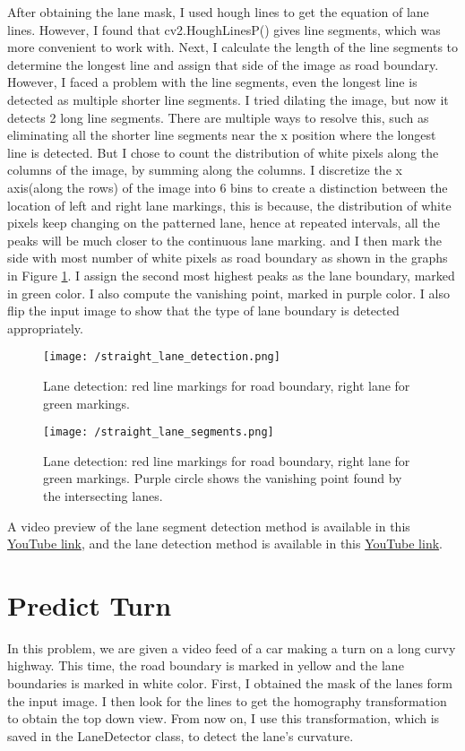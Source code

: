 \documentclass[a4paper, 10pt]{article}
\begin{document}
\begin{multicols}{2}
		After obtaining the lane mask, I used hough lines to get the equation of lane lines. However, I found that cv2.HoughLinesP() gives line segments, which was more convenient to work with. Next, I calculate the length of the line segments to determine the longest line and assign that side of the image as road boundary. However, I faced a problem with the line segments, even the longest line is detected as multiple shorter line segments. I tried dilating the image, but now it detects 2 long line segments. There are multiple ways to resolve this, such as eliminating all the shorter line segments near the x position where the longest line is detected. But I chose to count the distribution of white pixels along the columns of the image, by summing along the columns. I discretize the x axis(along the rows) of the image into 6 bins to create a distinction between the location of left and right lane markings, this is because, the distribution of white pixels keep changing on the patterned lane, hence at repeated intervals, all the peaks will be much closer to the continuous lane marking. and I then mark the side with most number of white pixels as road boundary as shown in the graphs in Figure \ref{fig:straight}. I assign the second most highest peaks as the lane boundary, marked in green color. I also compute the vanishing point, marked in purple color. I also flip the input image to show that the type of lane boundary is detected appropriately. 
		
		\begin{figure}[H]
			\centering
			\texttt{[image: /straight\_lane\_detection.png]}
			\caption{Lane detection: red line markings for road boundary, right lane for green markings. }
			\label{fig:straight}
		\end{figure}
		
		\begin{figure}[H]
			\centering
			\texttt{[image: /straight\_lane\_segments.png]}
			\caption{Lane detection: red line markings for road boundary, right lane for green markings. Purple circle shows the vanishing point found by the intersecting lanes.}
			\label{fig:straight_segments}
		\end{figure}
		
		A video preview of the lane segment detection method is available in this \href{https://youtu.be/6CWymeqQOWk}{YouTube link}, and the lane detection method is available in this \href{https://youtu.be/fkf3r3iCl74}{YouTube link}.
		
		\section{Predict Turn}	
		In this problem, we are given a video feed of a car making a turn on a long curvy highway. This time, the road boundary is marked in yellow and the lane boundaries is marked in white color. First, I obtained the mask of the lanes form the input image. I then look for the lines to get the homography transformation to obtain the top down view. From now on, I use this transformation, which is saved in the LaneDetector class, to detect the lane's curvature. 
		

\end{multicols}
\end{document}
